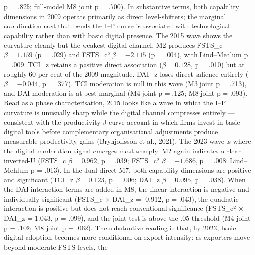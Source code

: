\documentclass[12pt,a4paper]{article}
\begin{document}
p = .825; full-model M8 joint p = .700). In substantive terms, both
capability dimensions in 2009 operate primarily as direct
level-shifters; the marginal coordination cost that bends the I--P curve
is associated with technological capability rather than with basic
digital presence. The 2015 wave shows the curvature cleanly but the
weakest digital channel. M2 produces FSTS\_c \(\beta = 1.159\) (p =
.029) and FSTS\_c² \(\beta = -2.115\) (p = .004), with Lind--Mehlum p =
.009. TCI\_z retains a positive direct association (\(\beta = 0.128\), p
= .010) but at roughly 60 per cent of the 2009 magnitude. DAI\_z loses
direct salience entirely (\(\beta = -0.044\), p = .377). TCI moderation
is null in this wave (M3 joint p = .713), and DAI moderation is at best
marginal (M4 joint p = .125; M8 joint p = .093). Read as a phase
characterisation, 2015 looks like a wave in which the I--P curvature is
unusually sharp while the digital channel compresses entirely ---
consistent with the productivity J-curve account in which firms invest
in basic digital tools before complementary organisational adjustments
produce measurable productivity gains (Brynjolfsson et al., 2021). The
2023 wave is where the digital-moderation signal emerges most sharply.
M2 again indicates a clear inverted-U (FSTS\_c \(\beta = 0.962\), p =
.039; FSTS\_c² \(\beta = -1.686\), p = .008; Lind--Mehlum p = .013). In
the dual-direct M7, both capability dimensions are positive and
significant (TCI\_z \(\beta = 0.123\), p = .006; DAI\_z
\(\beta = 0.095\), p = .038). When the DAI interaction terms are added
in M8, the linear interaction is negative and individually significant
(FSTS\_c × DAI\_z = -0.912, p = .043), the quadratic interaction is
positive but does not reach conventional significance (FSTS\_c² × DAI\_z
= 1.043, p = .099), and the joint test is above the .05 threshold (M4
joint p = .102; M8 joint p = .062). The substantive reading is that, by
2023, basic digital adoption becomes more conditional on export
intensity: as exporters move beyond moderate FSTS levels, the
\end{document}
